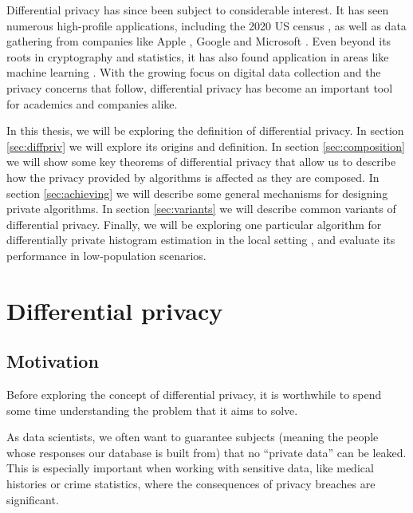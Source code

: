 \documentclass[12pt]{article}
\begin{document}
Differential privacy has since been subject to considerable interest. It has seen numerous high-profile applications, including the 2020 US census \cite{us_census}, as well as data gathering from companies like Apple \cite{apple_differential,apple_differential_loss}, Google \cite{google_rappor,google_prochlo} and Microsoft \cite{dworketal2006,microsoft_telemetry}. Even beyond its roots in cryptography and statistics, it has also found application in areas like machine learning \cite{ml_abadi,ml_shokri,ml_papernot}. With the growing focus on digital data collection and the privacy concerns that follow, differential privacy has become an important tool for academics and companies alike.

\bigskip

In this thesis, we will be exploring the definition of differential privacy. In section \ref{sec:diffpriv} we will explore its origins and definition. In section \ref{sec:composition} we will show some key theorems of differential privacy that allow us to describe how the privacy provided by algorithms is affected as they are composed. In section \ref{sec:achieving} we will describe some general mechanisms for designing private algorithms. In section \ref{sec:variants} we will describe common variants of differential privacy. Finally, we will be exploring one particular algorithm for differentially private histogram estimation in the local setting \cite{microsoft_telemetry}, and evaluate its performance in low-population scenarios.

\section{Differential privacy \label{sec:diffpriv}}

\subsection{Motivation \label{sec:motivation}}

Before exploring the concept of differential privacy, it is worthwhile to spend some time understanding the problem that it aims to solve. \bigskip

As data scientists, we often want to guarantee subjects (meaning the people whose responses our database is built from) that no ``private data'' can be leaked. This is especially important when working with sensitive data, like medical histories or crime statistics, where the consequences of privacy breaches are significant.
\end{document}
